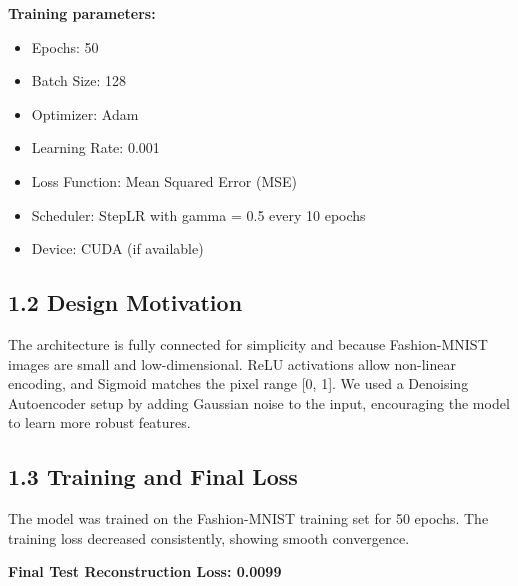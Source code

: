 \documentclass[12pt]{article}
\begin{document}
\textbf{Training parameters:}

\begin{itemize}
    \item Epochs: 50
    \item Batch Size: 128
    \item Optimizer: Adam
    \item Learning Rate: 0.001
    \item Loss Function: Mean Squared Error (MSE)
    \item Scheduler: StepLR with gamma = 0.5 every 10 epochs
    \item Device: CUDA (if available)
\end{itemize}

\subsection*{1.2 Design Motivation}

The architecture is fully connected for simplicity and because Fashion-MNIST images are small and low-dimensional. ReLU activations allow non-linear encoding, and Sigmoid matches the pixel range [0, 1]. We used a Denoising Autoencoder setup by adding Gaussian noise to the input, encouraging the model to learn more robust features.

\subsection*{1.3 Training and Final Loss}

The model was trained on the Fashion-MNIST training set for 50 epochs. The training loss decreased consistently, showing smooth convergence.

\begin{center}
\textbf{Final Test Reconstruction Loss: 0.0099}
\end{center}
\end{document}
